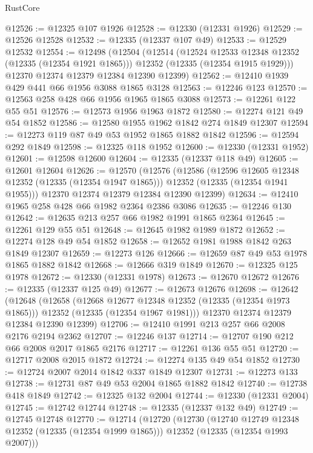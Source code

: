 \begin{lexlean}{RustCore}
\begin{coremodule}
@12526 := @12325 @107 @1926
@12528 := @12330 (@12331 @1926)
@12529 := @12526 @12528
@12532 := @12335 (@12337 @107 @49)
@12533 := @12529 @12532
@12554 := @12498
    (@12504
      (@12514
        (@12524 @12533 @12348 @12352 (@12335 (@12354 @1921 @1865)))
        @12352
        (@12335 (@12354 @1915 @1929)))
      @12370
      @12374
      @12379
      @12384
      @12390
      @12399)
@12562 := @12410 @1939 @429 @441 @66 @1956 @3088 @1865 @3128
@12563 := @12246 @123
@12570 := @12563 @258 @428 @66 @1956 @1965 @1865 @3088
@12573 := @12261 @122 @55 @51
@12576 := @12573 @1956 @1963 @1872
@12580 := @12274 @121 @49 @54 @1852
@12586 := @12580 @1955 @1962 @1842 @274 @1849 @12307
@12594 := @12273 @119 @87 @49 @53 @1952 @1865 @1882 @1842
@12596 := @12594 @292 @1849
@12598 := @12325 @118 @1952
@12600 := @12330 (@12331 @1952)
@12601 := @12598 @12600
@12604 := @12335 (@12337 @118 @49)
@12605 := @12601 @12604
@12626 := @12570
    (@12576
      (@12586
        (@12596 @12605 @12348 @12352 (@12335 (@12354 @1947 @1865)))
        @12352
        (@12335 (@12354 @1941 @1955)))
      @12370
      @12374
      @12379
      @12384
      @12390
      @12399)
@12634 := @12410 @1965 @258 @428 @66 @1982 @2364 @2386 @3086
@12635 := @12246 @130
@12642 := @12635 @213 @257 @66 @1982 @1991 @1865 @2364
@12645 := @12261 @129 @55 @51
@12648 := @12645 @1982 @1989 @1872
@12652 := @12274 @128 @49 @54 @1852
@12658 := @12652 @1981 @1988 @1842 @263 @1849 @12307
@12659 := @12273 @126
@12666 := @12659 @87 @49 @53 @1978 @1865 @1882 @1842
@12668 := @12666 @319 @1849
@12670 := @12325 @125 @1978
@12672 := @12330 (@12331 @1978)
@12673 := @12670 @12672
@12676 := @12335 (@12337 @125 @49)
@12677 := @12673 @12676
@12698 := @12642
    (@12648
      (@12658
        (@12668 @12677 @12348 @12352 (@12335 (@12354 @1973 @1865)))
        @12352
        (@12335 (@12354 @1967 @1981)))
      @12370
      @12374
      @12379
      @12384
      @12390
      @12399)
@12706 := @12410 @1991 @213 @257 @66 @2008 @2176 @2194 @2362
@12707 := @12246 @137
@12714 := @12707 @190 @212 @66 @2008 @2017 @1865 @2176
@12717 := @12261 @136 @55 @51
@12720 := @12717 @2008 @2015 @1872
@12724 := @12274 @135 @49 @54 @1852
@12730 := @12724 @2007 @2014 @1842 @337 @1849 @12307
@12731 := @12273 @133
@12738 := @12731 @87 @49 @53 @2004 @1865 @1882 @1842
@12740 := @12738 @418 @1849
@12742 := @12325 @132 @2004
@12744 := @12330 (@12331 @2004)
@12745 := @12742 @12744
@12748 := @12335 (@12337 @132 @49)
@12749 := @12745 @12748
@12770 := @12714
    (@12720
      (@12730
        (@12740 @12749 @12348 @12352 (@12335 (@12354 @1999 @1865)))
        @12352
        (@12335 (@12354 @1993 @2007)))

\end{coremodule}
\end{lexlean}
